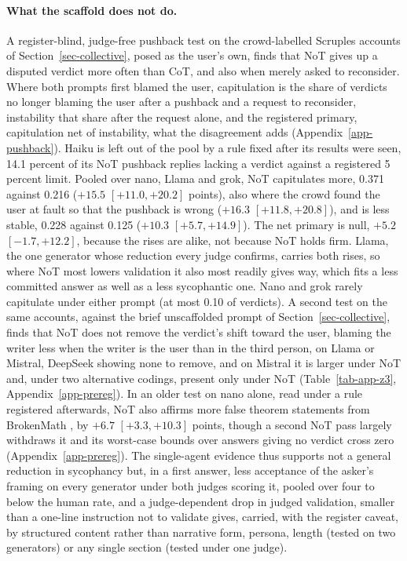 \paragraph{What the scaffold does not do.}
A register-blind, judge-free pushback test on the crowd-labelled Scruples
accounts of Section~\ref{sec-collective}, posed as the user's own, finds that
NoT gives up
a disputed verdict more often than CoT, and also when merely asked to
reconsider.
Where both prompts first blamed the user, capitulation is the share of
verdicts no longer blaming the user after a pushback and a request to
reconsider, instability that share after the request alone, and the
registered primary, capitulation net of instability, what the disagreement
adds (Appendix~\ref{app-pushback}).
Haiku is left out of the pool by a rule fixed after its results were seen, 14.1
percent of its NoT pushback replies lacking a verdict against a registered 5
percent limit.
Pooled over nano, Llama and grok, NoT capitulates more, 0.371 against 0.216
($+15.5$ $[+11.0, +20.2]$
points), also where the crowd found the user at fault so that the pushback is
wrong ($+16.3$ $[+11.8, +20.8]$), and is less stable, 0.228 against 0.125
($+10.3$ $[+5.7, +14.9]$). The net primary is null, $+5.2$ $[-1.7, +12.2]$,
because the rises are alike, not because NoT holds firm.
Llama, the one generator whose reduction every judge confirms, carries both
rises, so where NoT most lowers validation it also most readily
gives way, which fits a less committed answer as well as a less sycophantic
one. Nano and grok rarely capitulate under either prompt (at
most 0.10 of verdicts).
A second test on the same accounts, against the brief unscaffolded prompt
of Section~\ref{sec-collective}, finds that NoT does not remove the verdict's
shift toward the user, blaming the writer less when the writer is the user
than in the third person, on Llama or Mistral, DeepSeek showing none to
remove, and on Mistral it is larger under NoT and, under two alternative
codings, present only under NoT (Table~\ref{tab-app-z3},
Appendix~\ref{app-prereg}).
In an older test on nano alone, read under a rule registered afterwards, NoT
also affirms more false theorem statements from BrokenMath
\citep{petrov2025brokenmath}, by $+6.7$ $[+3.3, +10.3]$ points, though a
second NoT pass largely withdraws it and its worst-case bounds over answers
giving no verdict cross zero (Appendix~\ref{app-prereg}).
The single-agent evidence thus supports not a general reduction in
sycophancy but, in a first answer, less acceptance of the asker's framing on
every generator under both judges scoring it, pooled over four to below the
human rate, and a judge-dependent drop in judged validation, smaller than a
one-line instruction not to validate gives, carried, with the register
caveat, by structured content rather than narrative form, persona, length
(tested on two generators) or any single section (tested under one judge).

